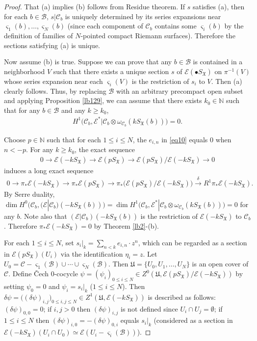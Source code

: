 \documentclass[12pt,b5paper,notitlepage]{report}
\theoremstyle{definition}
\theoremstyle{plain}
\newcommand{\fk}{\mathfrak}
\newcommand{\mc}{\mathcal}
\newcommand{\scr}{\mathscr}
\newcommand{\sgm}{\varsigma}
\newcommand{\SX}{S_{\fk X}}
\newcommand{\mbb}{\mathbb}
\newcommand{\blt}{\bullet}
\numberwithin{equation}{section}
\begin{document}
\begin{proof}
That (a) implies (b) follows from Residue theorem. If $s$ satisfies (a), then for each $b\in\mc B$, $s|\mc C_b$ is uniquely determined by its series expansions near $\sgm_1(b),\dots,\sgm_N(b)$ (since each component of $\mc C_b$ contains some $\sgm_i(b)$ by the definition of families of $N$-pointed compact Riemann surfaces). Therefore the sections satisfying (a) is unique.

Now assume (b) is true.  Suppose we can prove that any $b\in\mc B$ is contained in a neighborhood $V$ such that there exists a unique section $s$ of $\scr E(\blt\SX)$ on $\pi^{-1}(V)$ whose series expansion near each $\sgm_i(V)$ is the restriction of $s_i$ to $V$. Then (a) clearly follows. Thus, by replacing $\mc B$ with an arbitrary precompact open subset and applying Proposition \ref{lb129}, we can assume that there exists $k_0\in\mbb N$ such that for any $b\in\mc B$ and any $k\geq k_0$,
\begin{align*}
H^1\big(\mc C_b,\scr E^*|\mc C_b\otimes\omega_{\mc C_b}(k\SX(b))\big)=0.
\end{align*}

Choose $p\in\mathbb N$ such that for each $1\leq i\leq N$, the $e_{i,n}$ in \eqref{eq10} equals $0$ when $n<-p$. For any $k\geq k_0$, the exact sequence
\begin{align*}
0\rightarrow \scr E(-k\SX)\rightarrow \scr E(p\SX)\rightarrow \scr E(p\SX)/\scr E(-k\SX)\rightarrow 0
\end{align*}
induces a long exact sequence
\begin{align}
0\rightarrow\pi_*\scr E(-k\SX)\rightarrow\pi_*\scr E(p\SX)\rightarrow \pi_*\big(\scr E(p\SX)/\scr E(-k\SX)\big)\xrightarrow{\delta}R^1\pi_*\scr E(-k\SX).\label{eq11}
\end{align}
By Serre duality, $\dim H^0\big(\mc C_b,(\scr E|\mc C_b)(-k\SX(b))\big)=\dim H^1\big(\mc C_b,\scr E^*|\mc C_b\otimes\omega_{\mc C_b}(k\SX(b))\big)=0$ for any $b$. Note also that $(\scr E|\mc C_b)(-k\SX(b))$ is the restriction of $\scr E(-k\SX)$ to $\mc C_b$. Therefore $\pi_*\scr E(-k\SX)=0$ by Theorem \ref{lb2}-(b).

For each $1\leq i\leq N$, set $s_i|_k=\sum_{n<k}e_{i,n}\cdot z^n$, which can be regarded as a section in $\scr E(p\SX)(U_i)$ via the identification $\eta_i=z$. Let $U_0=\mc C-\sgm_1(\mc B)\cup\cdots\cup\sgm_N(\mc B)$. Then $\fk U=\{U_0,U_1,\dots,U_N \}$ is an open cover of $\mc C$. Define \v{C}ech $0$-cocycle $\psi=(\psi_i)_{0\leq i\leq N}\in Z^0(\fk U,\scr E(p\SX)/\scr E(-k\SX))$ by setting $\psi_0=0$ and $\psi_i=s_i|_k$ ($1\leq i\leq N$). Then $\delta\psi=\big((\delta\psi)_{i,j}\big)_{0\leq i,j\leq N}\in Z^1(\fk U,\scr E(-k\SX))$ is described as follows: $(\delta\psi)_{0,0}=0$; if $i,j>0$ then $(\delta\psi)_{i,j}$ is not defined since $U_i\cap U_j=\emptyset$; if $1\leq i\leq N$ then $(\delta\psi)_{i,0}=-(\delta\psi)_{0,i}$ equals $s_i|_k$ (considered as a section in $\scr E(-k\SX)(U_i\cap U_0)\simeq \scr E(U_i-\sgm_i(\mc B))$).


\end{proof}
\end{document}
